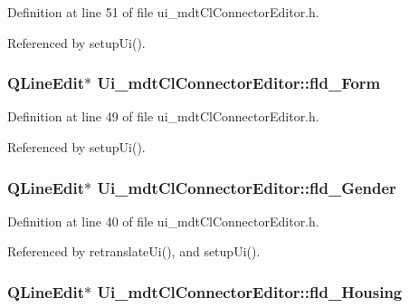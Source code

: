 Definition at line 51 of file ui\-\_\-mdt\-Cl\-Connector\-Editor.\-h.



Referenced by setup\-Ui().

\hypertarget{class_ui__mdt_cl_connector_editor_aab9a8796abaa833ac62d026189792549}{
\subsubsection[{fld\-\_\-\-Form}]{\setlength{\rightskip}{0pt plus 5cm}Q\-Line\-Edit$\ast$ Ui\-\_\-mdt\-Cl\-Connector\-Editor\-::fld\-\_\-\-Form}}\label{class_ui__mdt_cl_connector_editor_aab9a8796abaa833ac62d026189792549}


Definition at line 49 of file ui\-\_\-mdt\-Cl\-Connector\-Editor.\-h.



Referenced by setup\-Ui().

\hypertarget{class_ui__mdt_cl_connector_editor_a529819c9704f981a3b1328268a57e888}{
\subsubsection[{fld\-\_\-\-Gender}]{\setlength{\rightskip}{0pt plus 5cm}Q\-Line\-Edit$\ast$ Ui\-\_\-mdt\-Cl\-Connector\-Editor\-::fld\-\_\-\-Gender}}\label{class_ui__mdt_cl_connector_editor_a529819c9704f981a3b1328268a57e888}


Definition at line 40 of file ui\-\_\-mdt\-Cl\-Connector\-Editor.\-h.



Referenced by retranslate\-Ui(), and setup\-Ui().

\hypertarget{class_ui__mdt_cl_connector_editor_acbab217f449a089e9a134371ef07415e}{
\subsubsection[{fld\-\_\-\-Housing}]{\setlength{\rightskip}{0pt plus 5cm}Q\-Line\-Edit$\ast$ Ui\-\_\-mdt\-Cl\-Connector\-Editor\-::fld\-\_\-\-Housing}}\label{class_ui__mdt_cl_connector_editor_acbab217f449a089e9a134371ef07415e}


